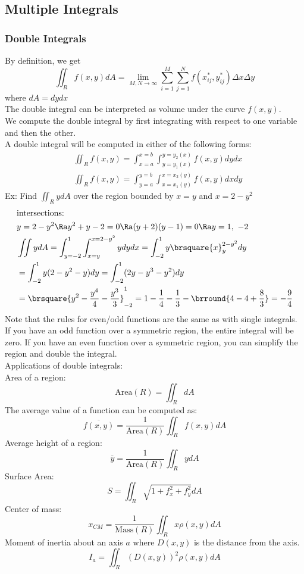 \subsection{Multiple Integrals}
\subsubsection{Double Integrals}
By definition, we get
$$\iint_Rf(x,y)dA=\lim_{M,N\to\infty}\sum_{i=1}^M\sum_{j=1}^Nf(x_{ij}^*,y_{ij}^*)\Delta x\Delta y$$
where $dA=dydx$\\
The double integral can be interpreted as volume under the curve $f(x,y)$.\\
We compute the double integral by first integrating with respect to one variable and then the other.\\
A double integral will be computed in either of the following forms:
\begin{align*}
    &\iint_Rf(x,y)=\int_{x=a}^{x=b}\int_{y=y_1(x)}^{y=y_2(x)}f(x,y)dydx\\
    &\iint_Rf(x,y)=\int_{y=a}^{y=b}\int_{x=x_1(y)}^{x=x_2(y)}f(x,y)dxdy
\end{align*}
Ex: Find $\iint_R ydA$ over the region bounded by $x=y$ and $x=2-y^2$
\begin{align*}
    &\text{intersections: }\\
    &y=2-y^2\Ra y^2+y-2=0\Ra (y+2)(y-1)=0\Ra y=1,\ -2\\
    &\iint ydA=\int_{y=-2}^1\int_{x=y}^{x=2-y^2}ydydx=\int_{-2}^1y\brsquare{x}_y^{2-y^2}dy\\
    &=\int_{-2}^1y(2-y^2-y)dy=\int_{-2}^1(2y-y^3-y^2)dy\\
    &=\brsquare{y^2-\frac{y^4}{4}-\frac{y^3}{3}}_{-2}^1=1-\frac{1}{4}-\frac{1}{3}-\brround{4-4+\frac{8}{3}}=-\frac{9}{4}
\end{align*}
Note that the rules for even/odd functions are the same as with single integrals. If you have an odd function over a symmetric region, the entire integral will be zero. If you have an even function over a symmetric region, you can simplify the region and double the integral.\\
Applications of double integrals:\\
Area of a region:
$$\text{Area}(R)=\iint_RdA$$
The average value of a function can be computed as:
$$\overline{f(x,y)}=\frac{1}{\text{Area}(R)}\iint_Rf(x,y)dA$$
Average height of a region:
$$\overline{y}=\frac{1}{\text{Area}(R)}\iint_RydA$$
Surface Area:
$$S=\iint_R\sqrt{1+f_x^2+f_y^2}dA$$
Center of mass:
$$x_{CM}=\frac{1}{\text{Mass}(R)}\iint_R x\rho(x,y)dA$$
Moment of inertia about an axis $a$ where $D(x,y)$ is the distance from the axis.
$$I_a=\iint_R(D(x,y))^2\rho(x,y)dA$$

